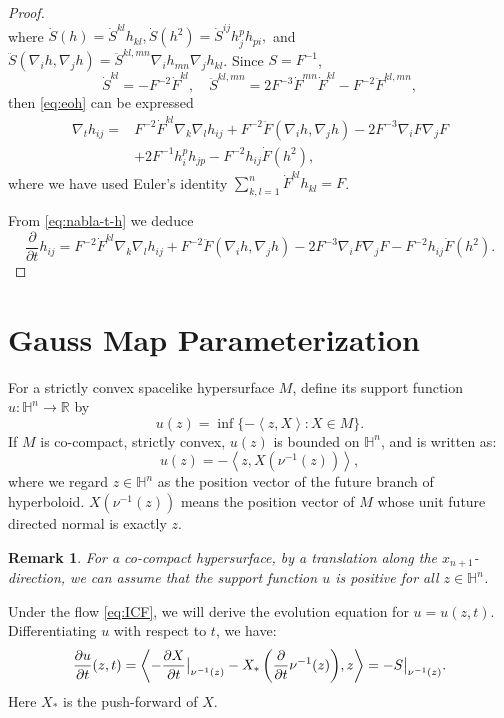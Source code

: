 \documentclass[10pt,a4paper]{amsart}
\newtheorem{remark}[theorem]{Remark}
\newcommand{\R}{\ensuremath{\mathbb{R}}}
\renewcommand{\H}{{\mathbb{H}}}
\newcommand{\pd}[2]{\frac{\partial {#1}}{\partial {#2}}}
\newcommand{\ip}[2]{\ensuremath{\left< {#1}, {#2} \right>}}
\numberwithin{equation}{section}
\begin{document}
\begin{proof}
\begin{equation}
\end{equation}
where \(\dot{S}(h) = \dot{S}^{kl}h_{kl},\dot{S}(h^2) = \dot{S}^{ij}h_j^p h_{pi},\) and \(\ddot{S}(\nabla_i h, \nabla_j h) = \ddot{S}^{kl,mn}\nabla_i h_{mn}\nabla_j h_{kl}\). Since \(S = F^{-1}\), 
\[\dot{S}^{kl} = -F^{-2}\dot{F}^{kl}, \quad \ddot{S}^{kl,mn} = 2F^{-3}\dot{F}^{mn}\dot{F}^{kl}-F^{-2}\ddot{F}^{kl,mn}, \]
then \eqref{eq:eoh} can be expressed
\begin{equation}\label{eq:nabla-t-h}
    \begin{aligned}
        \nabla_t h_{ij} = &F^{-2}\dot{F}^{kl}\nabla_k\nabla_l h_{ij}+F^{-2}\ddot{F}(\nabla_i h, \nabla_j h)-2F^{-3}\nabla_i F \nabla_j F\\
        &+ 2F^{-1}h_i^p h_{jp} - F^{-2}h_{ij}\dot{F}(h^2),
    \end{aligned}
\end{equation}
where we have used Euler's identity \(\sum_{k,l=1}^{n}\dot{F}^{kl}h_{kl} = F\). 
\par From \eqref{eq:nabla-t-h} we deduce 
\begin{equation}\label{eq:evolution of h}
    \pd{}{t} h_{ij} = F^{-2}\dot{F}^{kl}\nabla_k\nabla_l h_{ij}+F^{-2}\ddot{F}(\nabla_i h, \nabla_j h)-2F^{-3}\nabla_i F \nabla_j F - F^{-2}h_{ij}\dot{F}(h^2).
\end{equation}

\end{proof}


\section{Gauss Map Parameterization}\label{sec:gauss-map}

For a strictly convex spacelike hypersurface \(M \), define its support function \(u:\H^n \to \R\) by \[ u(z) = \inf\{-\ip{z}{X}: X \in M\}. \]  
If \(M\) is co-compact, strictly convex, \(u(z)\) is bounded on \( \H^n\), and is written as:
\[ u(z) = -\ip{z}{X(\nu^{-1}(z))},  \]
where we regard \(z\in \H^n\) as the position vector of the future branch of hyperboloid. \(X(\nu^{-1}(z))\) means the position vector of \(M\) whose unit future directed normal is exactly \(z\). 
\begin{remark}
  For a co-compact hypersurface, by a translation along the \(x_{n+1}\)-direction, we can assume that the support function \(u\) is positive for all \(z \in \H^n\). 
\end{remark}

\par Under the flow \eqref{eq:ICF}, we will derive the evolution equation for \(u = u(z,t)\). Differentiating $u$ with respect to \(t\), we have: 
\begin{equation}\label{eq:pd{u}{t}}
    \pd{u}{t}(z,t) = \ip{-\pd{X}{t}\big|_{\nu^{-1}(z)} - X_{*}\left( \pd{}{t}\nu^{-1}(z) \right)}{z} = -S\big|_{\nu^{-1}(z)}.
\end{equation}
Here $X_*$ is the push-forward of $X$.
\end{document}
